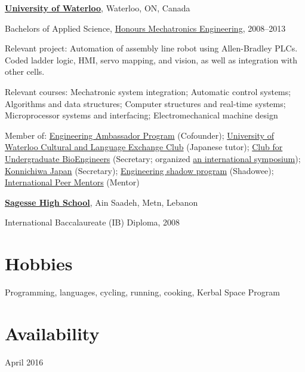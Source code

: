 \documentclass[10pt, a4paper]{article}
\begin{document}
\halfblankline

\href{https://www.uwaterloo.ca/}{\textbf{University of Waterloo}}, Waterloo, ON, Canada
\begin{outerlist}
\item[] Bachelors of Applied Science, \href{https://uwaterloo.ca/mechanical-mechatronics-engineering/program-overview}{Honours Mechatronics Engineering}, 2008--2013
  \begin{innerlist}
  \item Relevant project: Automation of assembly line robot using Allen-Bradley PLCs.
    Coded ladder logic, HMI, servo mapping, and vision, as well as integration with other cells.
  \item Relevant courses:
	  Mechatronic system integration;
	  Automatic control systems;
	  Algorithms and data structures;
	  Computer structures and real-time systems;
	  Microprocessor systems and interfacing;
	  Electromechanical machine design
  \item Member of:
	  \href{https://uwaterloo.ca/engineering-student-ambassadors/}{Engineering Ambassador Program} (Cofounder);
	  \href{http://uwclec.webs.com/}{University of Waterloo Cultural and Language Exchange Club} (Japanese tutor);
	  \href{http://cube.uwaterloo.ca/}{Club for Undergraduate BioEngineers} (Secretary; organized \href{http://cube.uwaterloo.ca/Symposium%202010%20web%20site/symp%202010.htm}{an international symposium});
	  \href{http://www.uwkonja.com/}{Konnichiwa Japan} (Secretary);
	  \href{https://uwaterloo.ca/engineering-student-ambassadors/shadow-program}{Engineering shadow program} (Shadowee);
	  \href{https://uwaterloo.ca/international-students/programs/international-peer-mentors}{International Peer Mentors} (Mentor)
  \end{innerlist}
\end{outerlist}

\halfblankline

\href{http://sagessehs.edu.lb/}{\textbf{Sagesse High School}}, Ain Saadeh, Metn, Lebanon
\begin{outerlist}
\item[] International Baccalaureate (IB) Diploma, 2008
\end{outerlist}

\section{Hobbies}
Programming, languages, cycling, running, cooking, Kerbal Space Program

\section{Availability}
April 2016
\end{document}
